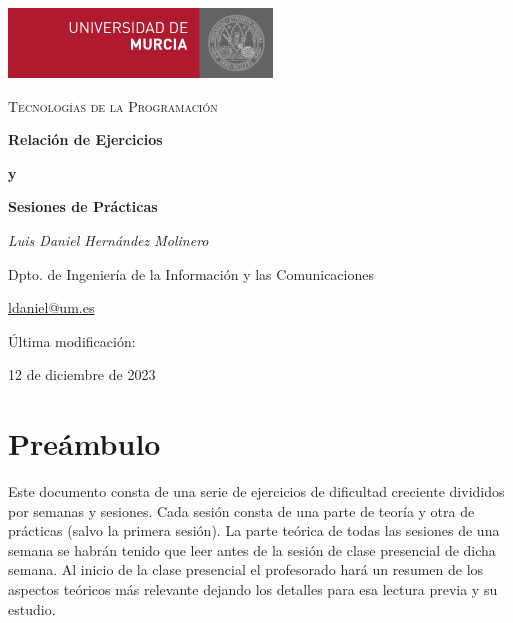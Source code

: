 \documentclass[10pt,pagestyle=titlesec]{ldanielbook}
\begin{document}


\pagestyle{empty}


\begin{titlepage}
	\flushright
		\includegraphics[width=.3\textwidth]{logo-um-peq.png}\par\vspace{1cm}
	\par
	\vspace{3cm}
	\centering
	{\scshape\Huge Tecnologías de la Programación\par}
	\vspace{2cm}
	{\huge\bfseries Relación de Ejercicios\par}
	\vspace{0.5cm}
	{\bfseries \huge y\par}
	\vspace{0.5cm}
	{\bfseries \huge Sesiones de Prácticas\par}
	\vspace{2cm}
	{\Large\itshape Luis Daniel Hernández Molinero\par}
	\vspace{0.4cm}
	{\large Dpto. de Ingeniería de la Información y las Comunicaciones\par}
	\vspace{0.4cm}
	{\large \url{ldaniel@um.es} \par}
	\vfill

	Última modificación: \par {\large 12 de diciembre de 2023} %
\end{titlepage}



\pagestyle{plain}

\section*{Preámbulo}

\noindent Este documento consta de una serie de ejercicios de dificultad creciente divididos por semanas y sesiones. Cada sesión consta de una parte de teoría y otra de prácticas (salvo la primera sesión). La parte teórica de todas las sesiones de una semana se habrán tenido que leer antes de la sesión de clase presencial de dicha semana. Al inicio de la clase presencial el profesorado hará un resumen de los aspectos teóricos más relevante dejando los detalles para esa lectura previa y su estudio.
\end{document}
